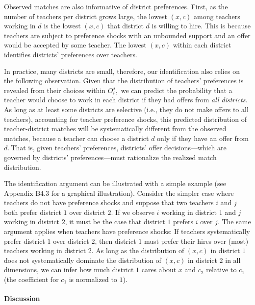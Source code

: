 \documentclass[notitlepage,12pt]{article}%
\begin{document}
Observed matches are also informative of district preferences. First, as the
number of teachers per district grows large, the lowest $\left(  x,c\right)  $
among teachers working in $d$ is the lowest $\left(  x,c\right)  $ that
district $d$ is willing to hire. This is because teachers are subject to
preference shocks with an unbounded support and an offer would be accepted by
some teacher. The lowest $\left(  x,c\right)  $ within each district
identifies districts' preferences over teachers.

In practice, many districts are small, therefore, our identification also
relies on the following observation. Given that the distribution of teachers'
preferences is revealed from their choices within $O_{i}^{s}$,\ we can predict
the probability that a teacher would choose to work in each district if they
had offers from \emph{all districts.} As long as at least some districts are
selective (i.e., they do not make offers to all teachers), accounting for
teacher preference shocks, this predicted distribution of teacher-district
matches will be systematically different from the observed matches, because a
teacher can choose a district $d$ only if they have an offer from $d.\ $That
is, given teachers' preferences, districts' offer decisions---which are
governed by districts' preferences---must rationalize the realized match distribution.

The identification argument can be illustrated with a simple example (see
Appendix B4.3 for a graphical illustration). Consider the simpler case
where teachers do not have preference shocks and suppose that two teachers $i$
and $j$ both prefer district $1$ over district $2$. If we observe $i$ working
in district $1$ and $j$ working in district $2$, it must be the case that
district $1$ prefers $i$ over $j.$ The same argument applies when teachers
have preference shocks: If teachers systematically prefer district $1$ over
district $2$, then district $1$ must prefer their hires over (most) teachers
working in district $2.$ As long as the distribution of $\left(  x,c\right)  $
in district $1$ does not systematically dominate the distribution of $\left(
x,c\right)  $ in district $2$ in all dimensions, we can infer how much
district $1$ cares about $x$ and $c_{2}$ relative to $c_{1}$ (the coefficient
for $c_{1}$ is normalized to $1$).

\paragraph{Discussion}
\end{document}
